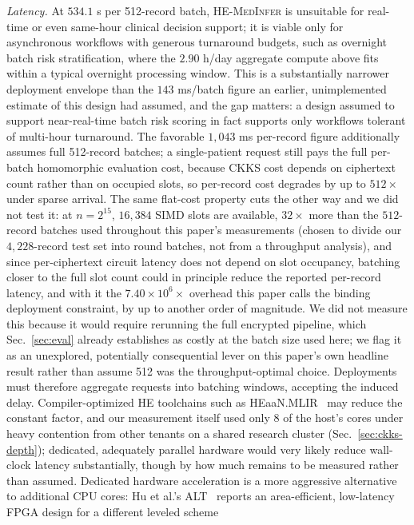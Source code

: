\documentclass[journal,compsoc]{IEEEtran}
\newcommand{\framework}{\textsc{HE-MedInfer}}
\begin{document}
\emph{Latency.} At $534.1$ s per 512-record batch, \framework{} is unsuitable
for real-time or even same-hour clinical decision support; it is viable only
for asynchronous workflows with generous turnaround budgets, such as overnight
batch risk stratification, where the $2.90$ h/day aggregate compute above
fits within a typical overnight processing window. This is a substantially
narrower deployment envelope than the $143$ ms/batch figure an earlier,
unimplemented estimate of this design had assumed, and the gap matters: a
design assumed to support near-real-time batch risk scoring in fact supports
only workflows tolerant of multi-hour turnaround. The favorable $1{,}043$ ms
per-record figure additionally assumes full 512-record batches; a
single-patient request still pays the full per-batch homomorphic evaluation
cost, because CKKS cost depends on ciphertext count rather than on occupied
slots, so per-record cost degrades by up to $512\times$ under sparse arrival.
The same flat-cost property cuts the other way and we did not test it: at
$n=2^{15}$, $16{,}384$ SIMD slots are available, $32\times$ more than the
$512$-record batches used throughout this paper's measurements (chosen to
divide our $4{,}228$-record test set into round batches, not from a
throughput analysis), and since per-ciphertext circuit latency does not
depend on slot occupancy, batching closer to the full slot count could in
principle reduce the reported per-record latency, and with it the
$7.40\times10^6\times$ overhead this paper calls the binding deployment
constraint, by up to another order of magnitude. We did not measure this
because it would require rerunning the full encrypted pipeline, which
Sec.~\ref{sec:eval} already establishes as costly at the batch size used
here; we flag it as an unexplored, potentially consequential lever on this
paper's own headline result rather than assume 512 was the throughput-optimal
choice.
Deployments must therefore aggregate requests into batching windows,
accepting the induced delay. Compiler-optimized HE toolchains such as
HEaaN.MLIR~\cite{heaan2024} may reduce the constant factor, and our measurement
itself used only 8 of the host's cores under heavy contention from other
tenants on a shared research cluster (Sec.~\ref{sec:ckks-depth}); dedicated,
adequately parallel hardware would very likely reduce wall-clock latency
substantially, though by how much remains to be measured rather than assumed.
Dedicated hardware acceleration is a more aggressive alternative to
additional CPU cores: Hu et al.'s ALT~\cite{hu2024alt} reports an
area-efficient, low-latency FPGA design for a different leveled scheme
\end{document}
